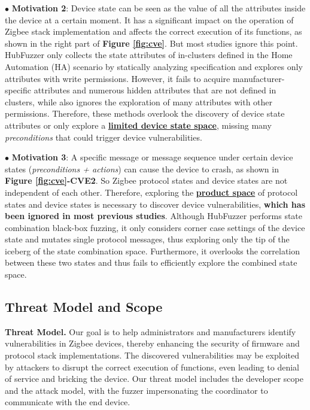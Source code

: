 \documentclass[10pt,journal,compsoc]{IEEEtran}
\begin{document}
\noindent $\bullet$ \textbf{Motivation 2}: Device state can be seen as the value of all the attributes inside the device at a certain moment. It has a significant impact on the operation of Zigbee stack implementation and affects the correct execution of its functions, as shown in the right part of \textbf{Figure \ref{fig:cve}}. But most studies \cite{ren2021z, meng2024large, wang2024llmif, redini2021diane, wang2022don, chen2019exploring, de2015protocol, fiterau2020analysis} ignore this point. HubFuzzer only collects the state attributes of in-clusters defined in the Home Automation (HA) scenario by statically analyzing specification and explores only attributes with write permissions. However, it fails to acquire manufacturer-specific attributes and numerous hidden attributes that are not defined in clusters, while also ignores the exploration of many attributes with other permissions. Therefore, these methods overlook the discovery of device state attributes or only explore a \textbf{\underline{limited device state space}}, missing many \textit{preconditions} that could trigger device vulnerabilities.\\ \vspace{-0.2cm}

\noindent $\bullet$ \textbf{Motivation 3}: A specific message or message sequence under certain device states (\textit{preconditions + actions}) can cause the device to crash, as shown in \textbf{Figure \ref{fig:cve}-CVE2}. So Zigbee protocol states and device states are not independent of each other. Therefore, exploring the \textbf{\underline{product space}} of protocol states and device states is necessary to discover device vulnerabilities, \textbf{which has been ignored in most previous studies}. Although HubFuzzer performs state combination black-box fuzzing, it only considers corner case settings of the device state and mutates single protocol messages, thus exploring only the tip of the iceberg of the state combination space. Furthermore, it overlooks the correlation between these two states and thus fails to efficiently explore the combined state space.

\subsection{Threat Model and Scope}

\textbf{Threat Model.} Our goal is to help administrators and manufacturers identify vulnerabilities in Zigbee devices, thereby enhancing the security of firmware and protocol stack implementations. The discovered vulnerabilities may be exploited by attackers to disrupt the correct execution of functions, even leading to denial of service and bricking the device. Our threat model includes the developer scope and the attack model, with the fuzzer impersonating the coordinator to communicate with the end device.
\end{document}

